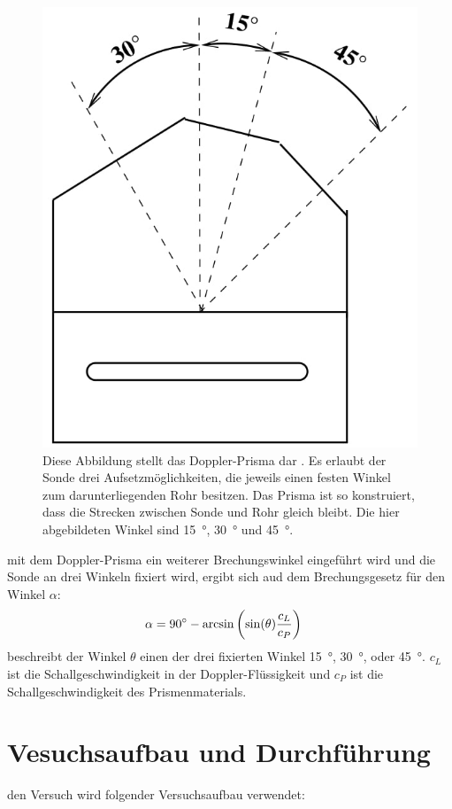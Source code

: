 \begin{figure}[H]
    \centering
    \includegraphics[width=0.35\linewidth]{images/Winkel.jpg}
    \caption{Diese Abbildung stellt das Doppler-Prisma dar \cite{V903}. Es erlaubt der Sonde drei Aufsetzmöglichkeiten, die jeweils einen festen Winkel zum darunterliegenden Rohr besitzen. Das
    Prisma ist so konstruiert, dass die Strecken zwischen Sonde und Rohr gleich bleibt. Die hier abgebildeten Winkel sind \SI{15}{\degree}, \SI{30}{\degree} und \SI{45}{\degree}.}
    \label{fig:2}
\end{figure}

    \justifying mit dem Doppler-Prisma ein weiterer Brechungswinkel eingeführt wird und die Sonde an drei Winkeln fixiert wird, ergibt sich aud dem Brechungsgesetz
    für den Winkel $\alpha$: \cite{V903}
    \begin{align}
        \alpha &= \text{\SI{90}{\degree}} - \arcsin\left( \sin(\theta) \frac{c_L}{c_P} \right) \label{eq:4}
    \end{align}
    \justifying beschreibt der Winkel $\theta$ einen der drei fixierten Winkel \SI{15}{\degree}, \SI{30}{\degree}, oder \SI{45}{\degree}. $c_L$ ist die Schallgeschwindigkeit
    in der Doppler-Flüssigkeit und $c_P$ ist die Schallgeschwindigkeit des Prismenmaterials.

\newpage
\section{Vesuchsaufbau und Durchführung}

    \justifying den Versuch wird folgender Versuchsaufbau verwendet:

